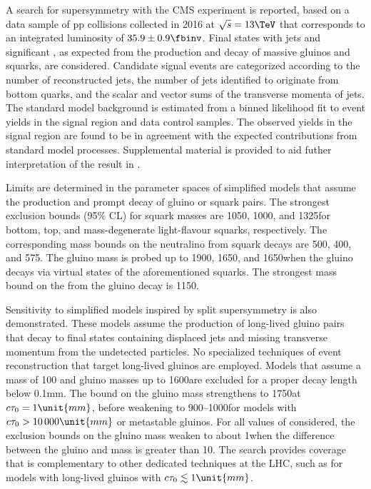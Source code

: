 A search for supersymmetry with the CMS experiment is reported, based
on a data sample of pp collisions collected in 2016 at $\sqrt{s} =
13\TeV$ that corresponds to an integrated luminosity of $35.9 \pm 0.9
\fbinv$. Final states with jets and significant \ptvecmiss, as
expected from the production and decay of massive gluinos and squarks,
are considered. Candidate signal events are categorized according to
the number of reconstructed jets, the number of jets identified to
originate from bottom quarks, and the scalar and vector sums of the
transverse momenta of jets. The standard model background is estimated
from a binned likelihood fit to event yields in the signal region and
data control samples. The observed yields in the signal region are
found to be in agreement with the expected contributions from standard
model processes. Supplemental material is provided to aid futher
interpretation of the result in \suppMaterial.

Limits are determined in the parameter spaces of simplified models
that assume the production and prompt decay of gluino or squark
pairs. The strongest exclusion bounds (95\% CL) for squark masses are
1050, 1000, and 1325\GeV for bottom, top, and mass-degenerate
light-flavour squarks, respectively. The corresponding mass bounds on
the neutralino \PSGczDo from squark decays are 500, 400, and
575\GeV. The gluino mass is probed up to 1900, 1650, and 1650\GeV when
the gluino decays via virtual states of the aforementioned
squarks. The strongest mass bound on the \PSGczDo from the gluino
decay is 1150\GeV.

Sensitivity to simplified models inspired by split supersymmetry is
also demonstrated. These models assume the production of long-lived
gluino pairs that decay to final states containing displaced jets and
missing transverse momentum from the undetected \PSGczDo particles. No
specialized techniques of event reconstruction that target long-lived
gluinos are employed. Models that assume a \PSGczDo mass of 100\GeV
and gluino masses up to 1600\GeV are excluded for a proper decay
length \ctau below 0.1\unit{mm}. The bound on the gluino mass
strengthens to 1750\GeV at $\ctau = 1\unit{mm}$, before weakening to
900--1000\GeV for models with $\ctau > 10\,000\unit{mm}$ or metastable
gluinos.  For all values of \ctau considered, the exclusion bounds on
the gluino mass weaken to about 1\TeV when the difference between the
gluino and \PSGczDo mass is greater than 10\GeV.  The search provides
coverage that is complementary to other dedicated techniques at the
LHC, such as for models with long-lived gluinos with $\ctau \lesssim
1\unit{mm}$.

